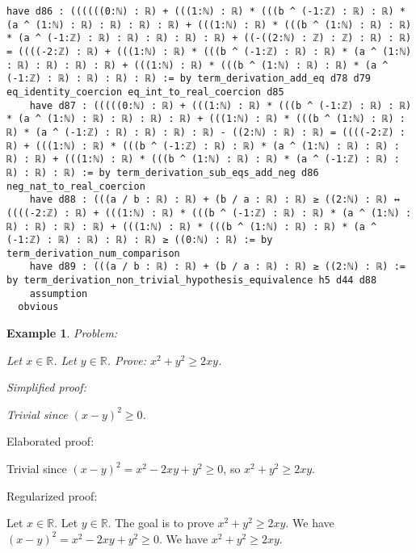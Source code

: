 \documentclass{article}
\newtheorem{example}{Example}
\begin{document}
\begin{tcolorbox}[colback=white!10, width=\linewidth]
\begin{lstlisting}[language=Lean4]
    have d86 : ((((((0:ℕ) : ℝ) + (((1:ℕ) : ℝ) * (((b ^ (-1:ℤ) : ℝ) : ℝ) * (a ^ (1:ℕ) : ℝ) : ℝ) : ℝ) : ℝ) + (((1:ℕ) : ℝ) * (((b ^ (1:ℕ) : ℝ) : ℝ) * (a ^ (-1:ℤ) : ℝ) : ℝ) : ℝ) : ℝ) : ℝ) + ((-((2:ℕ) : ℤ) : ℤ) : ℝ) : ℝ) = ((((-2:ℤ) : ℝ) + (((1:ℕ) : ℝ) * (((b ^ (-1:ℤ) : ℝ) : ℝ) * (a ^ (1:ℕ) : ℝ) : ℝ) : ℝ) : ℝ) + (((1:ℕ) : ℝ) * (((b ^ (1:ℕ) : ℝ) : ℝ) * (a ^ (-1:ℤ) : ℝ) : ℝ) : ℝ) : ℝ) := by term_derivation_add_eq d78 d79 eq_identity_coercion eq_int_to_real_coercion d85
    have d87 : (((((0:ℕ) : ℝ) + (((1:ℕ) : ℝ) * (((b ^ (-1:ℤ) : ℝ) : ℝ) * (a ^ (1:ℕ) : ℝ) : ℝ) : ℝ) : ℝ) + (((1:ℕ) : ℝ) * (((b ^ (1:ℕ) : ℝ) : ℝ) * (a ^ (-1:ℤ) : ℝ) : ℝ) : ℝ) : ℝ) - ((2:ℕ) : ℝ) : ℝ) = ((((-2:ℤ) : ℝ) + (((1:ℕ) : ℝ) * (((b ^ (-1:ℤ) : ℝ) : ℝ) * (a ^ (1:ℕ) : ℝ) : ℝ) : ℝ) : ℝ) + (((1:ℕ) : ℝ) * (((b ^ (1:ℕ) : ℝ) : ℝ) * (a ^ (-1:ℤ) : ℝ) : ℝ) : ℝ) : ℝ) := by term_derivation_sub_eqs_add_neg d86 neg_nat_to_real_coercion
    have d88 : (((a / b : ℝ) : ℝ) + (b / a : ℝ) : ℝ) ≥ ((2:ℕ) : ℝ) ↔ ((((-2:ℤ) : ℝ) + (((1:ℕ) : ℝ) * (((b ^ (-1:ℤ) : ℝ) : ℝ) * (a ^ (1:ℕ) : ℝ) : ℝ) : ℝ) : ℝ) + (((1:ℕ) : ℝ) * (((b ^ (1:ℕ) : ℝ) : ℝ) * (a ^ (-1:ℤ) : ℝ) : ℝ) : ℝ) : ℝ) ≥ ((0:ℕ) : ℝ) := by term_derivation_num_comparison
    have d89 : (((a / b : ℝ) : ℝ) + (b / a : ℝ) : ℝ) ≥ ((2:ℕ) : ℝ) := by term_derivation_non_trivial_hypothesis_equivalence h5 d44 d88
    assumption
  obvious

\end{lstlisting}
\end{tcolorbox}


\begin{example}
Problem:
\begin{tcolorbox}[colback=yellow!10, width=\linewidth]
Let $x\in\mathbb{R}$. Let $y\in\mathbb{R}$.
    Prove: $x^2 + y^2 \ge 2xy$.
\end{tcolorbox}

Simplified proof:
\begin{tcolorbox}[colback=blue!10, width=\linewidth]
Trivial since $(x-y)^2 \ge 0$.
\end{tcolorbox}
\end{example}

Elaborated proof:
\begin{tcolorbox}[colback=green!10, width=\linewidth]
Trivial since $(x-y)^2 = x^2 -2xy + y^2 \ge 0$, so $x^2 + y^2 \ge 2xy$.
\end{tcolorbox}

Regularized proof:
\begin{tcolorbox}[colback=red!10, width=\linewidth]
Let $x\in\mathbb{R}$.
Let $y\in\mathbb{R}$.
The goal is to prove $x^2 + y^2 \ge 2xy$.
We have ${{(x-y)}}^2 = x^2 -2xy + y^2 \ge 0$.
We have $x^2 + y^2 \ge 2xy$.
\end{tcolorbox}
\end{document}
